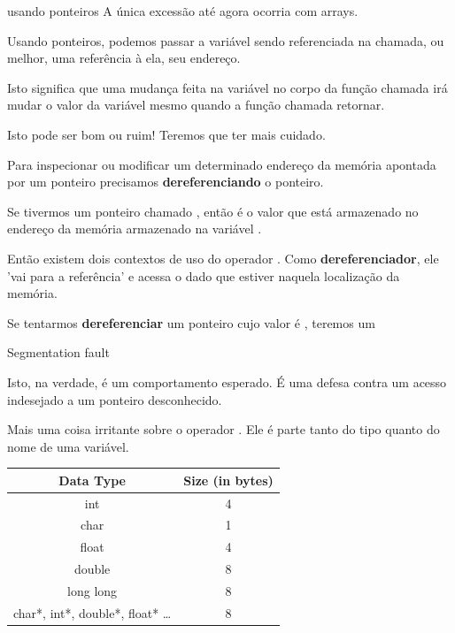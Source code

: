 \documentclass{beamer}
\begin{document}
\begin{frame}{usando ponteiros}
  A única excessão até agora ocorria com arrays.

  \framebreak

  Usando ponteiros, podemos passar a variável sendo referenciada na
  chamada, ou melhor, uma referência à ela, seu endereço.

  Isto significa que uma mudança feita na variável no corpo da função
  chamada irá mudar o valor da variável mesmo quando a função chamada
  retornar.

  Isto pode ser bom ou ruim! Teremos que ter mais cuidado.

  \framebreak

  Para inspecionar ou modificar um determinado endereço da memória
  apontada por um ponteiro precisamos \textbf{dereferenciando} o
  ponteiro.

  Se tivermos um ponteiro chamado , então  é o
  valor que está armazenado no endereço da memória armazenado na
  variável .

  \framebreak

  Então existem dois contextos de uso do operador \ilcode{*}. Como
  \textbf{dereferenciador}, ele 'vai para a referência' e acessa o
  dado que estiver naquela localização da memória.

  Se tentarmos \textbf{dereferenciar} um ponteiro cujo valor é
  , teremos um

  \begin{center}
    {\color{red} Segmentation fault}
  \end{center}
  
  Isto, na verdade, é um comportamento esperado. É uma defesa contra
  um acesso indesejado a um ponteiro desconhecido.

  \framebreak

  Mais uma coisa irritante sobre o operador \ilcode{*}. Ele é parte
  tanto do tipo quanto do nome de uma variável.

  
  
  \framebreak

  \begin{center}
    \begin{tabular}{cc}
      \hline
      Data Type & Size (in bytes)\\
      \hline
      int & 4\\
      char & 1\\
      float & 4\\
      double & 8\\
      long long & 8\\
      char*, int*, double*, float* \ldots & 8\\
      \hline
    \end{tabular}
  \end{center}

\end{frame}
  
\end{document}

